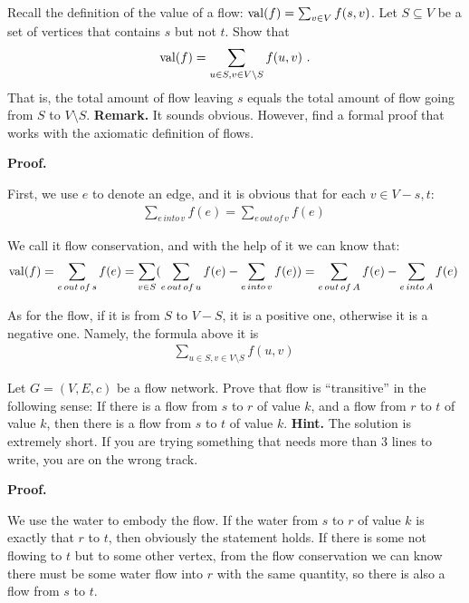 
\begin{exercise}
   Recall the definition of the value of a flow: ${\rm val}(f) = \sum_{v \in V} f(s,v)$.
   Let $S \subseteq V$ be a set of vertices that contains $s$ but not $t$. Show that
   \begin{align*}
         {\rm val}(f) = \sum_{u \in S, v \in V \setminus S} f(u,v) \ .
   \end{align*}
   That is, the total amount of flow leaving $s$ equals the total amount of flow 
   going from $S$ to $V \setminus S$.
   \textbf{Remark.} It sounds obvious. However, find a formal proof that works with the 
   axiomatic definition of flows. 
\end{exercise}

   \par \textbf{Proof.}
   \par First, we use $e$ to denote an edge, and it is obvious that for each $v\in V-{s,t}$:
   \begin{align*}
         \sum_{e\,into\,v} f(e)= \sum_{e\,out\,of\,v}f(e)\
   \end{align*}
   \par We call it flow conservation, and with the help of it we can know that:
   \begin{align*}
         {\rm val}(f)
         =\sum_{e\,out\,of\,s} f(e)
         =\sum_{v\in S}(\sum_{e\,out\,of\,u}f(e)-\sum_{e\,into\,v}f(e))
         =\sum_{e\,out\,of\,A}f(e)-\sum_{e\,into\,A}f(e)
          \
   \end{align*}
   \par As for the flow, if it is from $S$ to $V-S$, it is a positive one, otherwise it is a negative one. Namely, the formula above it is
   \begin{align*}
         \sum_{u \in S, v \in V \setminus S} f(u,v) \
   \end{align*}



\begin{exercise}
Let $G = (V,E,c)$ be a flow network.
  Prove that flow is ``transitive'' in the following sense: 
  If there is a flow from $s$ to $r$ of value $k$,
  and a flow from $r$ to $t$ of value $k$, then
  there is a flow from $s$ to $t$ of value $k$.
  \textbf{Hint.} The solution is extremely short. If you are trying
  something that needs more than 3 lines to write, you are on the wrong
  track.
\end{exercise}

  \par\textbf{Proof.}
  \par We use the water to embody the flow. If the water from $s$ to $r$ of value $k$ is exactly that $r$ to $t$, then obviously the statement holds. If there is some not flowing to $t$ but to some other vertex, from the flow conservation we can know there must be some water flow into $r$ with the same quantity, so there is also a flow from $s$ to $t$.


